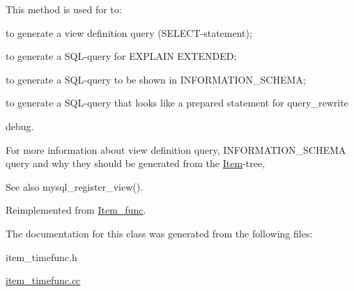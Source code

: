 This method is used for to\+:
\begin{DoxyItemize}
\item to generate a view definition query (S\+E\+L\+E\+CT-\/statement);
\item to generate a S\+QL-\/query for E\+X\+P\+L\+A\+IN E\+X\+T\+E\+N\+D\+ED;
\item to generate a S\+QL-\/query to be shown in I\+N\+F\+O\+R\+M\+A\+T\+I\+O\+N\+\_\+\+S\+C\+H\+E\+MA;
\item to generate a S\+QL-\/query that looks like a prepared statement for query\+\_\+rewrite
\item debug.
\end{DoxyItemize}

For more information about view definition query, I\+N\+F\+O\+R\+M\+A\+T\+I\+O\+N\+\_\+\+S\+C\+H\+E\+MA query and why they should be generated from the \mbox{\hyperlink{classItem}{Item}}-\/tree, \begin{DoxySeeAlso}{See also}
mysql\+\_\+register\+\_\+view(). 
\end{DoxySeeAlso}


Reimplemented from \mbox{\hyperlink{classItem__func_afb302ee25d4721ace27d3f5053d4ee41}{Item\+\_\+func}}.



The documentation for this class was generated from the following files\+:\begin{DoxyCompactItemize}
\item 
item\+\_\+timefunc.\+h\item 
\mbox{\hyperlink{item__timefunc_8cc}{item\+\_\+timefunc.\+cc}}\end{DoxyCompactItemize}
